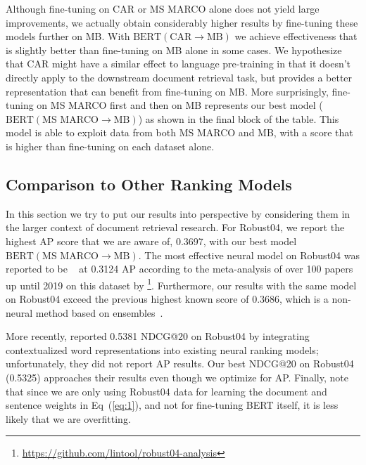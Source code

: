 Although fine-tuning on CAR or MS MARCO alone does not yield large improvements, we actually obtain considerably higher results by fine-tuning these models further on MB.
With $ \textrm{BERT}(\textrm{CAR}\rightarrow\textrm{MB}) $ we achieve effectiveness that is slightly better than fine-tuning on MB alone in some cases.
We hypothesize that CAR might have a similar effect to language pre-training in that it doesn't directly apply to the downstream document retrieval task, but provides a better representation that can benefit from fine-tuning on MB.
More surprisingly, fine-tuning on MS MARCO first and then on MB represents our best model ($ \textrm{BERT}(\textrm{MS MARCO}\rightarrow\textrm{MB}) $) as shown in the final block of the table.
This model is able to exploit data from both MS MARCO and MB, with a score that is higher than fine-tuning on each dataset alone.

\subsection{Comparison to Other Ranking Models}

In this section we try to put our results into perspective by considering them in the larger context of document retrieval research.
For Robust04, we report the highest AP score that we are aware of, 0.3697, with our best model $ \textrm{BERT}(\textrm{MS MARCO}\rightarrow\textrm{MB}) $.
The most effective neural model on Robust04 was reported to be ~\cite{} at 0.3124 AP according to the meta-analysis of over 100 papers up until 2019 on this dataset by \cite{}\footnote{\url{https://github.com/lintool/robust04-analysis}}.
Furthermore, our results with the same model on Robust04 exceed the previous highest known score of 0.3686, which is a non-neural method based on ensembles~\cite{Cormack:2009:RRF:1571941.1572114}.

More recently, \cite{MacAvaney_etal_SIGIR2019} reported 0.5381 NDCG@20 on Robust04 by integrating contextualized word representations into existing neural ranking models; unfortunately, they did not report AP results.
Our best NDCG@20 on \mbox{Robust04} (0.5325) approaches their results even though we optimize for AP.
Finally, note that since we are only using Robust04 data for learning the document and sentence weights in Eq~(\ref{eq:1}), and not for fine-tuning BERT itself, it is less likely that we are overfitting.

